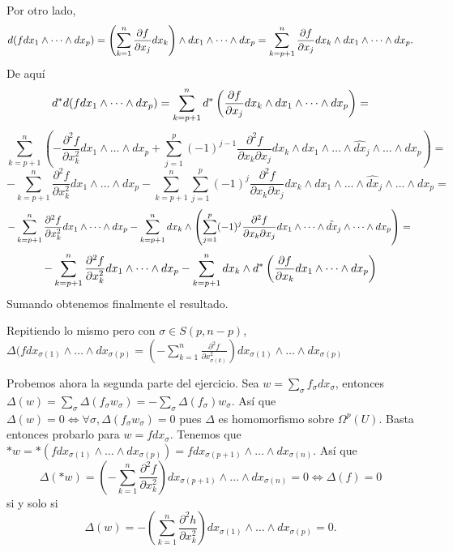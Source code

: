 \documentclass[twoside]{article}
\begin{document}
\begin{solucion}
Por otro lado, $$d(f dx_1\land\dots\land dx_p)=\left(\sum_{k=1}^n\frac{\partial f}{\partial x_j}dx_k\right)\land dx_1\land\dots\land dx_p=\sum_{k=p+1}^n\frac{\partial f}{\partial x_j}dx_k\land dx_1\land\dots\land dx_p.$$
De aquí
\[
d^*d(f dx_1\land\dots\land dx_p)=\sum_{k=p+1}^nd^*\left(\frac{\partial f}{\partial x_j}dx_k\land dx_1\land\dots\land dx_p\right)=
\]
\[
\sum_{k=p+1}^n\left(-\frac{\partial^2 f}{\partial x_k^2}dx_1\land\dots\land dx_p+\sum_{j=1}^p (-1)^{j-1}\frac{\partial^2 f}{\partial x_k\partial x_j}dx_k\land dx_1\land\dots\land\hat{dx}_j\land\dots\land dx_p\right)=
\]
\[
-\sum_{k=p+1}^n\frac{\partial^2 f}{\partial x_k^2}dx_1\land\dots\land dx_p-\sum_{k=p+1}^n\sum_{j=1}^p(-1)^{j}\frac{\partial^2 f}{\partial x_k\partial x_j}dx_k\land dx_1\land\dots\land\hat{dx}_j\land\dots\land dx_p=
\]
\[
-\sum_{k=p+1}^n\frac{\partial^2 f}{\partial x_k^2}dx_1\land\dots\land dx_p-\sum_{k=p+1}^n dx_k\land\left(\sum_{j=1}^p(-1)^{j}\frac{\partial^2 f}{\partial x_k\partial x_j} dx_1\land\dots\land\hat{dx}_j\land\dots\land dx_p\right)=\\
\]
\[
-\sum_{k=p+1}^n\frac{\partial^2 f}{\partial x_k^2}dx_1\land\dots\land dx_p-\sum_{k=p+1}^ndx_k\land d^*\left(\frac{\partial f}{\partial x_k} dx_1\land\dots\land dx_p\right)
\]
Sumando obtenemos finalmente el resultado.
\begin{nota}
Repitiendo lo mismo pero con $\sigma\in S(p,n-p)$, $\Delta(f dx_{\sigma(1)}\land\dots\land dx_{\sigma(p)}=\left(-\sum_{k=1}^n\frac{\partial^2 f}{\partial x_{\sigma(k)}^2}\right) dx_{\sigma(1)}\land\dots\land dx_{\sigma(p)}$
\end{nota}

Probemos ahora la segunda parte del ejercicio.  Sea $w=\sum_{\sigma} f_{\sigma}dx_{\sigma}$, entonces $\Delta(w)=\sum_{\sigma} \Delta(f_{\sigma}w_{\sigma})=-\sum_{\sigma}\Delta(f_{\sigma})w_{\sigma}$. Así que $\Delta(w)=0\Leftrightarrow \forall\sigma, \Delta(f_{\sigma}w_{\sigma})=0$ pues $\Delta$ es homomorfismo sobre $\Omega^p(U)$. Basta entonces probarlo para $w=fdx_{\sigma}$. Tenemos que $*w=*(fdx_{\sigma(1)}\land\dots\land dx_{\sigma(p)})=fdx_{\sigma(p+1)}\land\dots\land dx_{\sigma(n)}$. Así que
\[
\Delta(*w)=\left(-\sum_{k=1}^n\frac{\partial^2 f}{\partial x_k^2}\right)dx_{\sigma(p+1)}\land\dots\land dx_{\sigma(n)}=0\Leftrightarrow \Delta(f)=0
\] 
si y solo si
\[
\Delta(w)=-\left(\sum_{k=1}^n\frac{\partial^2 h}{\partial x_k^2}\right)dx_{\sigma(1)}\land\dots\land dx_{\sigma(p)}=0.
\]
\end{solucion}
\newpage
\end{document}
